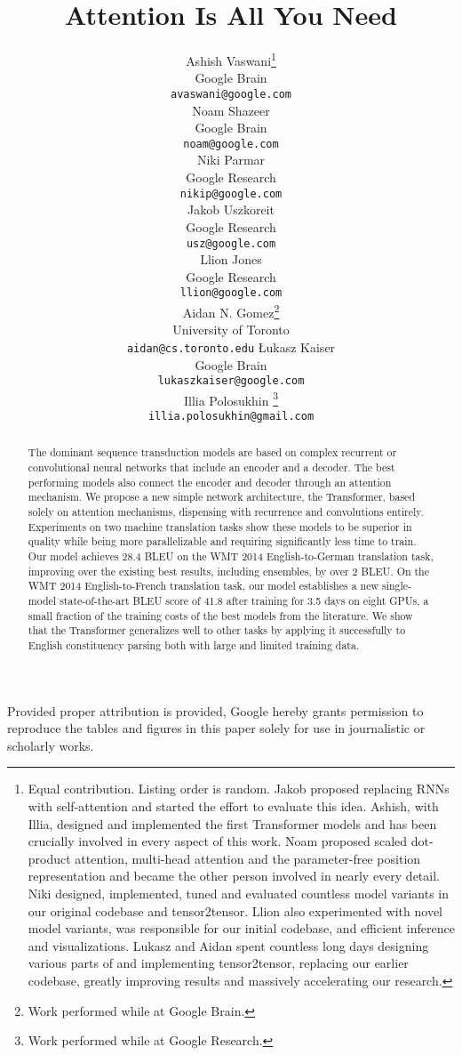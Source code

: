 \documentclass{article}
\title{Attention Is All You Need}
\author{
  \AND
  Ashish Vaswani\thanks{Equal contribution. Listing order is random. Jakob proposed replacing RNNs with self-attention and started the effort to evaluate this idea.
Ashish, with Illia, designed and implemented the first Transformer models and has been crucially involved in every aspect of this work. Noam proposed scaled dot-product attention, multi-head attention and the parameter-free position representation and became the other person involved in nearly every detail. Niki designed, implemented, tuned and evaluated countless model variants in our original codebase and tensor2tensor. Llion also experimented with novel model variants, was responsible for our initial codebase, and efficient inference and visualizations. Lukasz and Aidan spent countless long days designing various parts of and implementing tensor2tensor, replacing our earlier codebase, greatly improving results and massively accelerating our research.
}\\
  Google Brain\\
  \texttt{avaswani@google.com}\\
  \And
  Noam Shazeer\footnotemark[1]\\
  Google Brain\\
  \texttt{noam@google.com}\\
  \And
  Niki Parmar\footnotemark[1]\\
  Google Research\\
  \texttt{nikip@google.com}\\  
  \And
  Jakob Uszkoreit\footnotemark[1]\\
  Google Research\\
  \texttt{usz@google.com}\\
  \And  
  Llion Jones\footnotemark[1]\\
  Google Research\\
  \texttt{llion@google.com}\\   
  \And
  Aidan N. Gomez\footnotemark[1] \hspace{1.7mm}\thanks{Work performed while at Google Brain.}\\
  University of Toronto\\
  \texttt{aidan@cs.toronto.edu}
  \And
  {\L}ukasz Kaiser\footnotemark[1]\\
  Google Brain\\
  \texttt{lukaszkaiser@google.com}\\
  \And
  Illia Polosukhin\footnotemark[1]\hspace{1.7mm} \thanks{Work performed while at Google Research.}\\
  \texttt{illia.polosukhin@gmail.com}\\  
}
\begin{document}
\begin{center}
    \color{red}
    \large Provided proper attribution is provided, Google hereby grants permission to reproduce the tables and figures in this paper solely for use in journalistic or scholarly works.
\end{center}

\maketitle

\begin{abstract}
The dominant sequence transduction models are based on complex recurrent or convolutional neural networks that include an encoder and a decoder. The best performing models also connect the encoder and decoder through an attention mechanism. We propose a new simple network architecture, the Transformer, based solely on attention mechanisms, dispensing with recurrence and convolutions entirely. Experiments on two machine translation tasks show these models to be superior in quality while being  more parallelizable and requiring significantly less time to train. Our model achieves 28.4 BLEU on the WMT 2014 English-to-German translation task, improving over the existing best results, including ensembles, by over 2 BLEU.  On the WMT 2014 English-to-French translation task, our model establishes a new single-model state-of-the-art BLEU score of 41.8 after training for 3.5 days on eight GPUs, a small fraction of the training costs of the best models from the literature. We show that the Transformer generalizes well to other tasks by applying it successfully to English constituency parsing  both with large and limited training data.



\end{abstract}
\end{document}
